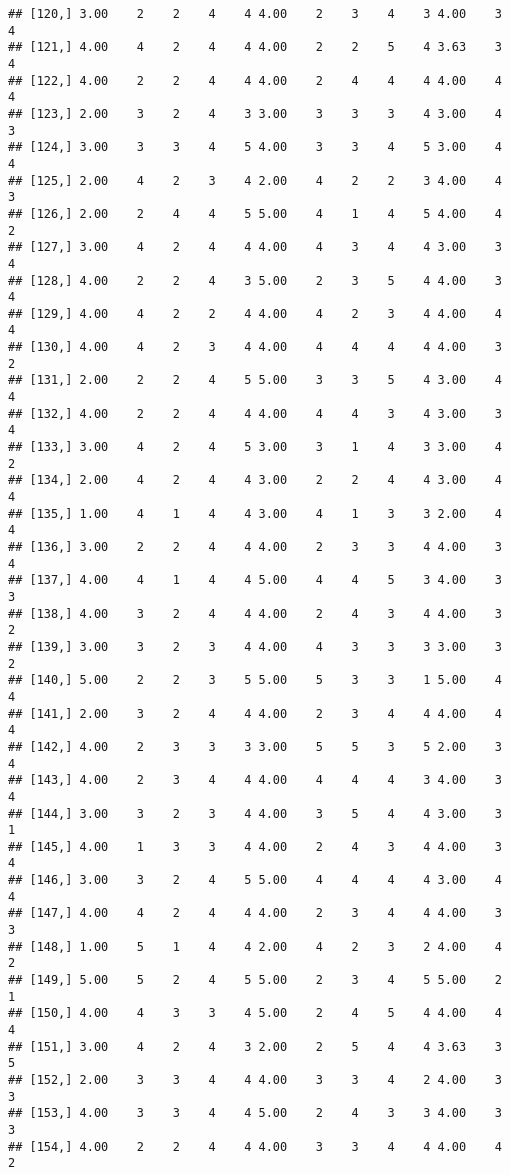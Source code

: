 \documentclass[]{article}
\begin{document}
\begin{verbatim}
## [120,] 3.00    2    2    4    4 4.00    2    3    4    3 4.00    3    4
## [121,] 4.00    4    2    4    4 4.00    2    2    5    4 3.63    3    4
## [122,] 4.00    2    2    4    4 4.00    2    4    4    4 4.00    4    4
## [123,] 2.00    3    2    4    3 3.00    3    3    3    4 3.00    4    3
## [124,] 3.00    3    3    4    5 4.00    3    3    4    5 3.00    4    4
## [125,] 2.00    4    2    3    4 2.00    4    2    2    3 4.00    4    3
## [126,] 2.00    2    4    4    5 5.00    4    1    4    5 4.00    4    2
## [127,] 3.00    4    2    4    4 4.00    4    3    4    4 3.00    3    4
## [128,] 4.00    2    2    4    3 5.00    2    3    5    4 4.00    3    4
## [129,] 4.00    4    2    2    4 4.00    4    2    3    4 4.00    4    4
## [130,] 4.00    4    2    3    4 4.00    4    4    4    4 4.00    3    2
## [131,] 2.00    2    2    4    5 5.00    3    3    5    4 3.00    4    4
## [132,] 4.00    2    2    4    4 4.00    4    4    3    4 3.00    3    4
## [133,] 3.00    4    2    4    5 3.00    3    1    4    3 3.00    4    2
## [134,] 2.00    4    2    4    4 3.00    2    2    4    4 3.00    4    4
## [135,] 1.00    4    1    4    4 3.00    4    1    3    3 2.00    4    4
## [136,] 3.00    2    2    4    4 4.00    2    3    3    4 4.00    3    4
## [137,] 4.00    4    1    4    4 5.00    4    4    5    3 4.00    3    3
## [138,] 4.00    3    2    4    4 4.00    2    4    3    4 4.00    3    2
## [139,] 3.00    3    2    3    4 4.00    4    3    3    3 3.00    3    2
## [140,] 5.00    2    2    3    5 5.00    5    3    3    1 5.00    4    4
## [141,] 2.00    3    2    4    4 4.00    2    3    4    4 4.00    4    4
## [142,] 4.00    2    3    3    3 3.00    5    5    3    5 2.00    3    4
## [143,] 4.00    2    3    4    4 4.00    4    4    4    3 4.00    3    4
## [144,] 3.00    3    2    3    4 4.00    3    5    4    4 3.00    3    1
## [145,] 4.00    1    3    3    4 4.00    2    4    3    4 4.00    3    4
## [146,] 3.00    3    2    4    5 5.00    4    4    4    4 3.00    4    4
## [147,] 4.00    4    2    4    4 4.00    2    3    4    4 4.00    3    3
## [148,] 1.00    5    1    4    4 2.00    4    2    3    2 4.00    4    2
## [149,] 5.00    5    2    4    5 5.00    2    3    4    5 5.00    2    1
## [150,] 4.00    4    3    3    4 5.00    2    4    5    4 4.00    4    4
## [151,] 3.00    4    2    4    3 2.00    2    5    4    4 3.63    3    5
## [152,] 2.00    3    3    4    4 4.00    3    3    4    2 4.00    3    3
## [153,] 4.00    3    3    4    4 5.00    2    4    3    3 4.00    3    3
## [154,] 4.00    2    2    4    4 4.00    3    3    4    4 4.00    4    2

\end{verbatim}
\end{document}
